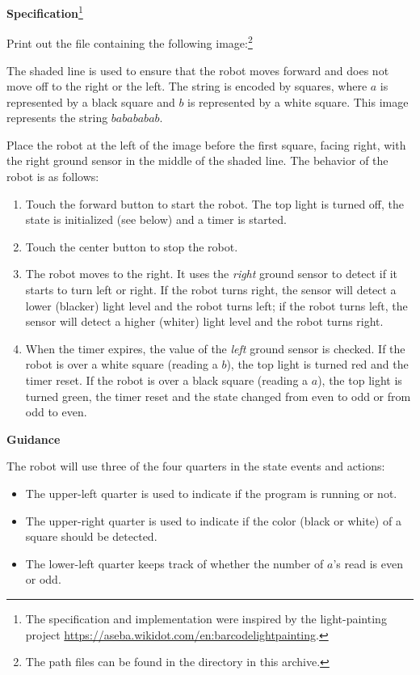 \textbf{Specification}\footnote{The specification and implementation
were inspired by the light-painting project
\url{https://aseba.wikidot.com/en:barcodelightpainting}.}

Print out the file  containing the
following image:\footnote{The path files can be found in the directory
 in this archive.}


The shaded line is used to ensure that the robot moves forward and does
not move off to the right or the left. The string is encoded by squares,
where $a$ is represented by a black square and $b$ is represented by a
white square. This image represents the string $babababab$.

Place the robot at the left of the image before the first square, facing
right, with the right ground sensor in the middle of the shaded line.
The behavior of the robot is as follows:

\begin{enumerate}

\item Touch the forward button to start the robot. The top light is
turned off, the state is initialized (see below) and a timer is started.

\item Touch the center button to stop the robot.

\item The robot moves to the right. It uses the \emph{right} ground
sensor to detect if it starts to turn left or right. If the robot turns
right, the sensor will detect a lower (blacker) light level and the
robot turns left; if the robot turns left, the sensor will detect a
higher (whiter) light level and the robot turns right.

\item When the timer expires, the value of the \emph{left} ground sensor
is checked. If the robot is over a white square (reading a $b$), the top
light is turned red and the timer reset. If the robot is over a black
square (reading a $a$), the top light is turned green, the timer reset
and the state changed from even to odd or from odd to even.

\end{enumerate}


\textbf{Guidance}

The robot will use three of the four quarters in the state events and
actions:

\begin{itemize}
\item The upper-left quarter is used to indicate if the program is
running or not.
\item The upper-right quarter is used to indicate if the color (black or
white) of a square should be detected.
\item The lower-left quarter keeps track of whether the
number of $a$'s read is even or odd.
\end{itemize}

